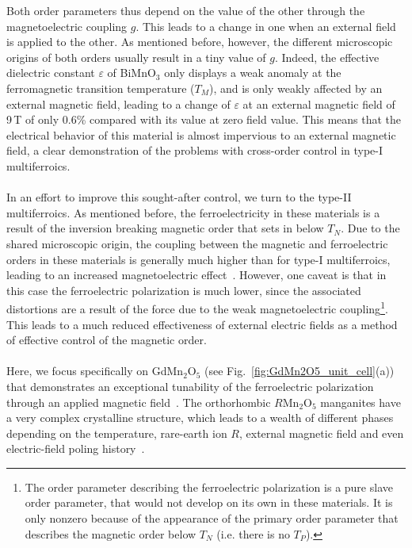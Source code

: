 Both order parameters thus depend on the value of the other through the magnetoelectric coupling $g$. This leads to a change in one when an external field is applied to the other.
As mentioned before, however, the different microscopic origins of both orders usually result in a tiny value of $g$.
Indeed, the effective dielectric constant $\varepsilon$ of BiMnO$_3$ only displays a weak anomaly at the ferromagnetic transition temperature ($T_M$), and is only weakly affected by an external magnetic field, leading to a change of $\varepsilon$ at an external magnetic field of 9\,T of only 0.6\% compared with its value at zero field value.
This means that the electrical behavior of this material is almost impervious to an external magnetic field, a clear demonstration of the problems with cross-order control in type-I multiferroics.
\\\\
In an effort to improve this sought-after control, we turn to the type-II multiferroics.
As mentioned before, the ferroelectricity in these materials is a result of the inversion breaking magnetic order that sets in below $T_N$.
Due to the shared microscopic origin, the coupling between the magnetic and ferroelectric orders in these materials is generally much higher than for type-I multiferroics, leading to an increased magnetoelectric effect~\cite{Oh2014,Radaelli08Y}.
However, one caveat is that in this case the ferroelectric polarization is much lower, since the associated distortions are a result of the force due to the weak magnetoelectric coupling\footnote{The order parameter describing the ferroelectric polarization is a pure slave order parameter, that would not develop on its own in these materials. It is only nonzero because of the appearance of the primary order parameter that describes the magnetic order below $T_N$ (i.e. there is no $T_{P}$).}.
This leads to a much reduced effectiveness of external electric fields as a method of effective control of the magnetic order.  
\\\\
Here, we focus specifically on GdMn$_2$O$_5$ (see Fig.~\ref{fig:GdMn2O5_unit_cell}(a)) that demonstrates an exceptional tunability of the ferroelectric polarization through an applied magnetic field~\cite{Khomskii2009,Lee13}.
The orthorhombic $R$Mn$_2$O$_5$ manganites have a very complex crystalline structure, which leads to a wealth of different phases depending on the temperature, rare-earth ion $R$, external magnetic field and even electric-field poling history~\cite{Chapon04, Chapon06, Blake05, Radaelli09,Radaelli08, Zheng2019}.

